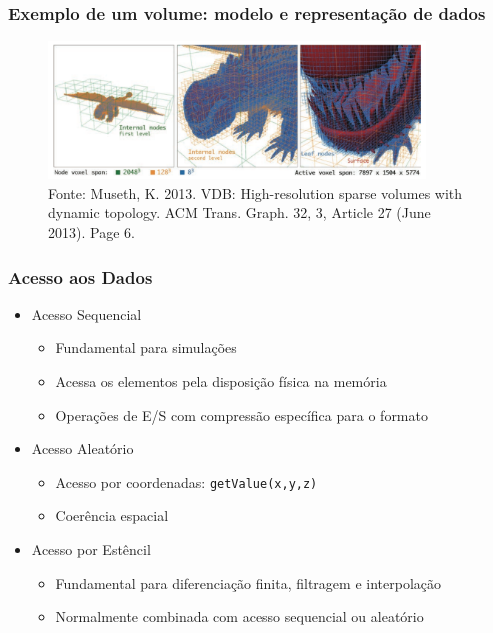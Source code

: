 \documentclass{beamer}
\begin{document}
\begin{frame}

\frametitle{Exemplo de um volume: modelo e representação de dados}

\begin{figure}[!htb]
\center
\includegraphics[width=10cm]{dragon}  
\caption*{\tiny Fonte: Museth, K. 2013. VDB: High-resolution sparse volumes with dynamic topology. ACM Trans. Graph. 32, 3, Article 27 (June 2013). Page 6.}
\end{figure}

\end{frame}

\begin{frame}

\frametitle{Acesso aos Dados}

\begin{itemize}
\item Acesso Sequencial
\begin{itemize}
\item Fundamental para simulações
\item Acessa os elementos pela disposição física na memória
\item Operações de E/S com compressão específica para o formato
\end{itemize}
\item Acesso Aleatório
\begin{itemize}
\item Acesso por coordenadas: \texttt{getValue(x,y,z)}
\item Coerência espacial
\end{itemize}
\item Acesso por Estêncil
\begin{itemize}
\item Fundamental para diferenciação finita, filtragem e interpolação
\item Normalmente combinada com acesso sequencial ou aleatório
\end{itemize}
\end{itemize}

\end{frame}
\end{document}
